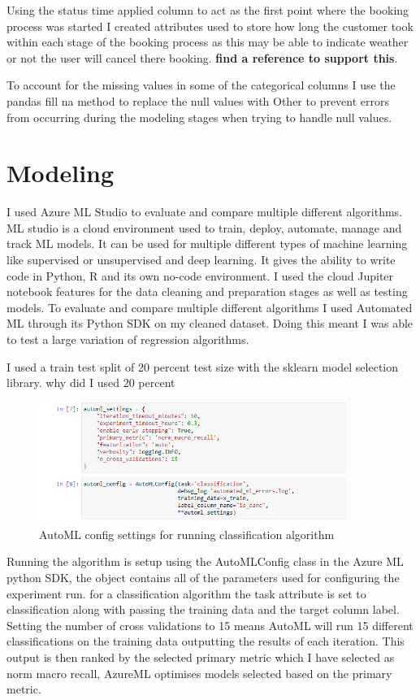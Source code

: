 Using the status time applied column to act as the first point where the booking process was started I created attributes used to store how long the customer took within each stage of the booking process as this may be able to indicate weather or not the user will cancel there booking.  \textbf{find a reference to support this}.

To account for the missing values in some of the categorical columns I use the pandas fill na method to replace the null values with Other  to prevent errors from occurring during the modeling stages when trying to handle null values.

\section{Modeling}

I used Azure ML Studio to evaluate and compare multiple different algorithms. ML studio is a cloud environment used to train, deploy, automate, manage and track ML models. It can be used for multiple different types of machine learning like supervised or unsupervised and deep learning. It gives the ability to write code in Python, R and its own no-code environment.  I used the cloud Jupiter notebook features for the data cleaning and preparation stages as well as testing models. To evaluate and compare multiple different algorithms I used Automated ML through its Python SDK on my cleaned dataset. Doing this meant I was able to test a large variation of regression algorithms.

I used a train test split of 20 percent test size with the sklearn model selection library. why did I used 20 percent

\begin{figure}[hbt!]
 \includegraphics[width=10cm]{figures/auto_ml_settings.png}
 \caption{AutoML config settings for running classification algorithm}
\end{figure}

Running the algorithm is setup using the AutoMLConfig class in the Azure ML python SDK, the object contains all of the parameters used for configuring the experiment run. for a classification algorithm the task attribute is set to classification along with passing the training data and the target column label. Setting the number of cross validations to 15 means AutoML will run 15 different classifications on the training data outputting the results of each iteration. This output is then ranked by the selected primary metric which I have selected as norm macro recall, AzureML optimises models selected based on the primary metric. 

